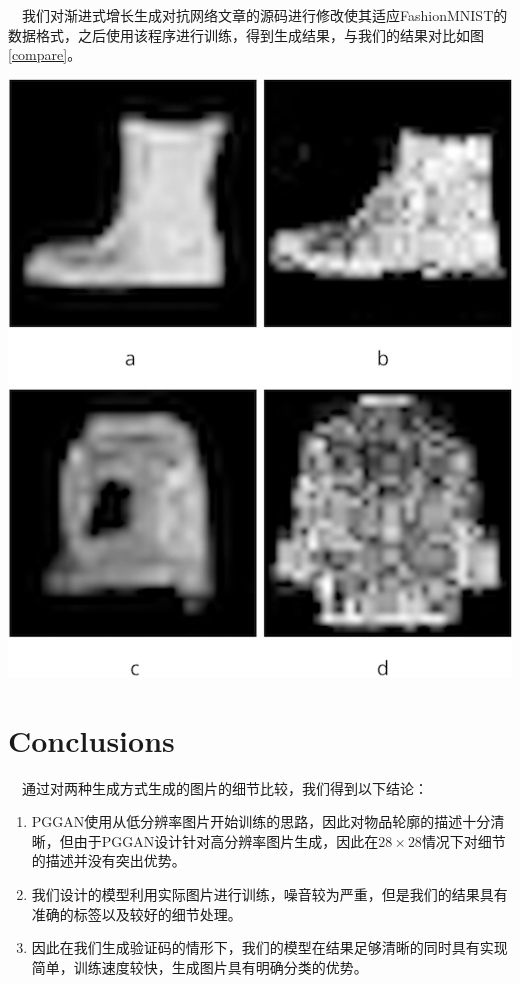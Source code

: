 \documentclass[portrait]{a0poster}
\begin{document}
\begin{multicols}{2}
\begin{CJK}{UTF8}{gbsn}
\ \ 我们对渐进式增长生成对抗网络\supercite{DBLP:journals/corr/abs-1710-10196}文章的源码进行修改使其适应FashionMNIST的数据格式，之后使用该程序进行训练，得到生成结果，与我们的结果对比如图\ref{compare}。
\begin{center}\vspace{1cm}
\includegraphics[width=0.7\linewidth]{compare.png}
\label{compare}
\end{center}\vspace{1cm}

\color{SaddleBrown}
\section*{Conclusions}

\ \ 通过对两种生成方式生成的图片的细节比较，我们得到以下结论：
\begin{enumerate}
	\item PGGAN\supercite{DBLP:journals/corr/abs-1710-10196}使用从低分辨率图片开始训练的思路，因此对物品轮廓的描述十分清晰，但由于PGGAN设计针对高分辨率图片生成，因此在$28 \times 28$情况下对细节的描述并没有突出优势。
	\item 我们设计的模型利用实际图片进行训练，噪音较为严重，但是我们的结果具有准确的标签以及较好的细节处理。
	\item 因此在我们生成验证码的情形下，我们的模型在结果足够清晰的同时具有实现简单，训练速度较快，生成图片具有明确分类的优势。
\end{enumerate}




\end{CJK}
\end{multicols}
\end{document}
